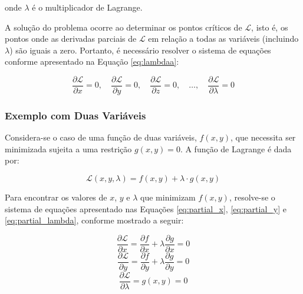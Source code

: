onde $\lambda$ é o multiplicador de Lagrange.

A solução do problema ocorre ao determinar os pontos críticos de $\mathcal{L}$, isto é, os pontos onde as derivadas parciais de $\mathcal{L}$ em relação a todas as variáveis (incluindo $\lambda$) são iguais a zero. Portanto, é necessário resolver o sistema de equações conforme apresentado na Equação \ref{eq:lambdaa}:

\begin{equation} \frac{\partial \mathcal{L}}{\partial x} = 0, \quad \frac{\partial \mathcal{L}}{\partial y} = 0, \quad \frac{\partial \mathcal{L}}{\partial z} = 0, \quad \dots, \quad \frac{\partial \mathcal{L}}{\partial \lambda} = 0 \label{eq:lambdaa} \end{equation}

\subsubsection{Exemplo com Duas Variáveis}

Considera-se o caso de uma função de duas variáveis, $f(x, y)$, que necessita ser minimizada sujeita a uma restrição $g(x, y) = 0$. A função de Lagrange é dada por:

\begin{equation}
	\mathcal{L}(x, y, \lambda) = f(x, y) + \lambda \cdot g(x, y)
	\label{eq:lagrange_two_variable}
\end{equation}

Para encontrar os valores de $x$, $y$ e $\lambda$ que minimizam $f(x, y)$, resolve-se o sistema de equações apresentado nas Equações \ref{eq:partial_x}, \ref{eq:partial_y} e \ref{eq:partial_lambda}, conforme mostrado a seguir:

\begin{equation}
	\frac{\partial \mathcal{L}}{\partial x} = \frac{\partial f}{\partial x} + \lambda \frac{\partial g}{\partial x} = 0
	\label{eq:partial_x}
\end{equation}
\begin{equation}
	\frac{\partial \mathcal{L}}{\partial y} = \frac{\partial f}{\partial y} + \lambda \frac{\partial g}{\partial y} = 0
	\label{eq:partial_y}
\end{equation}
\begin{equation}
	\frac{\partial \mathcal{L}}{\partial \lambda} = g(x, y) = 0
	\label{eq:partial_lambda}
\end{equation}

